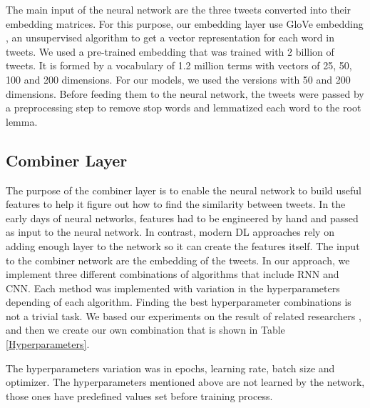 \documentclass[12pt]{report}
\begin{document}

The main input of the neural network are the three tweets converted into their embedding matrices. For this purpose, our embedding layer use GloVe embedding \cite{Pennington2014}, an unsupervised algorithm to get a vector representation for each word in tweets. We used a pre-trained embedding that was trained with 2 billion of tweets. It is formed by a vocabulary of 1.2 million  terms with vectors of 25, 50, 100 and 200 dimensions. For our  models, we used the versions 
with 50 and 200 dimensions. Before feeding them to the neural network, the tweets were passed by a preprocessing step to remove stop words and lemmatized each word to the root lemma.



\subsection{Combiner Layer}
The purpose of the combiner layer is to enable the neural network to build useful features to help it figure out how to find the similarity between tweets. 
In the early days of neural networks, features had to be engineered by hand and passed as input to the neural network. In contrast, modern DL approaches
rely on adding enough layer to the network so it can create the features itself. The input to the combiner network are the embedding of the tweets.
In our approach,  we implement three different combinations of algorithms that include RNN and CNN.  Each method was implemented with variation in the hyperparameters depending of each algorithm.
Finding the best hyperparameter combinations is not a trivial task. We based our experiments on the result of related researchers \cite{8622504}, and then we create our own combination that is shown in Table \ref{Hyperparameters}.

The hyperparameters variation was in epochs, learning rate, batch size and optimizer. The hyperparameters mentioned above are not learned by the network, those ones have predefined values set before training process.
\end{document}
